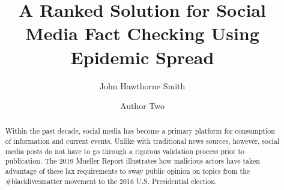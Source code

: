 \documentclass[preprint,12pt]{elsarticle}
\begin{document}
\begin{frontmatter}



\title{A Ranked Solution for Social Media Fact Checking Using Epidemic Spread}


\author[inst1]{John Hawthorne Smith}


\author[inst2]{Author Two}

\begin{abstract}
Within the past decade, social media has become a primary platform for consumption of information and current events. Unlike with traditional news sources, however, social media posts do not have to go through a rigorous validation process prior to publication. The 2019 Mueller Report illustrates how malicious actors have taken advantage of these lax requirements to sway public opinion on topics from the \#blacklivesmatter movement to the 2016 U.S. Presidential election. 


\end{abstract}
\end{frontmatter}
\end{document}
